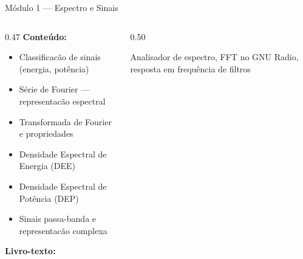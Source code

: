 \documentclass[aspectratio=169]{beamer}
\begin{document}
\begin{frame}{M\'{o}dulo 1 --- Espectro e Sinais}
\begin{columns}
\begin{column}{0.47\textwidth}
  \textbf{Conte\'{u}do:}
  \begin{itemize}
    \item Classificac\~{a}o de sinais (energia, pot\^{e}ncia)
    \item S\'{e}rie de Fourier --- representac\~{a}o espectral
    \item Transformada de Fourier e propriedades
    \item Densidade Espectral de Energia (DEE)
    \item Densidade Espectral de Pot\^{e}ncia (DEP)
    \item Sinais passa-banda e representac\~{a}o complexa
  \end{itemize}
  \vspace{0.1cm}
  \textbf{Livro-texto:}~\cite{lathi2019modern, oppenheim2010signals}
\end{column}
\begin{column}{0.50\textwidth}
  \vspace{0.1cm}
  \small Analisador de espectro, FFT no GNU Radio,
  resposta em frequ\^{e}ncia de filtros
\end{column}
\end{columns}
\end{frame}
\end{document}
